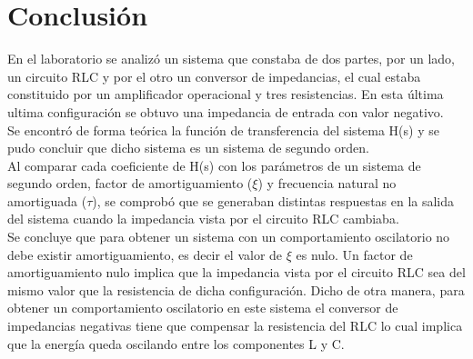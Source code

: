 \documentclass[10pt,a4paper]{article} %
\begin{document}
\section{Conclusión}
En el laboratorio se analizó un sistema que constaba de dos partes, por un lado, un circuito RLC y por el otro un conversor de impedancias, el cual estaba constituido por un amplificador operacional y tres resistencias. En esta última ultima configuración se obtuvo una impedancia de entrada con valor negativo. \\

Se encontró de forma teórica la función de transferencia del sistema H(s) y se pudo concluir que dicho sistema es un sistema de segundo orden.\\

Al comparar cada coeficiente de H(s) con los parámetros de un sistema de segundo orden, factor de amortiguamiento ($ \xi $) y frecuencia natural no amortiguada ($ \tau $), se comprobó que se generaban distintas respuestas en la salida del sistema cuando la impedancia vista por el circuito RLC cambiaba.\\

Se concluye que para obtener un sistema con un comportamiento oscilatorio no debe existir amortiguamiento, es decir el valor de $ \xi $ es nulo. Un factor de amortiguamiento nulo implica que la impedancia vista por el circuito RLC sea del mismo valor que la resistencia de dicha configuración.  Dicho de otra manera, para obtener un comportamiento oscilatorio en este sistema el conversor de impedancias negativas tiene que compensar la resistencia del RLC lo cual implica que la energía queda oscilando entre los componentes L y C. 


  
\end{document}
